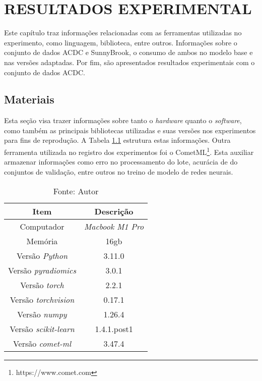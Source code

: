 \chapter{RESULTADOS EXPERIMENTAL}
\label{chap:proposta_experimental}

Este capítulo traz informações relacionadas com as ferramentas utilizadas no experimento, como linguagem, biblioteca, entre outros. Informações sobre o conjunto de dados \gls{ACDC} e SunnyBrook, o consumo de ambos no modelo base e nas versões adaptadas. Por fim, são apresentados resultados experimentais com o conjunto de dados \gls{ACDC}. 

\section{Materiais} 
\label{sec:cap5_materiais}

Esta seção visa trazer informações sobre tanto o \textit{hardware} quanto o \textit{software}, como também as principais bibliotecas utilizadas e suas versões nos experimentos para fins de reprodução. A Tabela \ref{tab:hardware_software} estrutura estas informações. Outra ferramenta utilizada no registro dos experimentos foi o CometML\footnote{https://www.comet.com}. Esta auxiliar armazenar informações como erro no processamento do lote, acurácia de do conjuntos de validação, entre outros no treino de modelo de redes neurais.
\newline

\begin{table}[hbtp]
    \centering
    \renewcommand{\arraystretch}{1} %
    \begin{tabular}{|c|c|}
    \hline 
       \textbf{Item} & \textbf{Descrição}\\
    \hline 
       Computador & \textit{Macbook M1 Pro}  \\
    \hline 
       Memória & 16gb  \\
    \hline 
       Versão \textit{Python} & 3.11.0  \\
    \hline 
       Versão \textit{pyradiomics} & 3.0.1 \\
    \hline 
       Versão \textit{torch} & 2.2.1 \\
    \hline 
       Versão \textit{torchvision} & 0.17.1 \\
    \hline 
       Versão \textit{numpy} & 1.26.4 \\
    \hline 
       Versão \textit{scikit-learn} & 1.4.1.post1 \\
    \hline 
       Versão \textit{comet-ml} & 3.47.4 \\
    \hline 
    \end{tabular} 
    \caption{Fonte: Autor}
    \label{tab:hardware_software}
\end{table}


